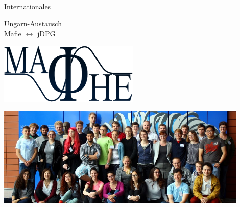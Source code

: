 \documentclass[
]{beamer}
\begin{document}
\begin{frame}{Internationales}
  \begin{minipage}{0.38\textwidth}
    \begin{center}
      Ungarn-Austausch \\ Mafie $\leftrightarrow$ jDPG
    \end{center}
    \begin{flushleft}
      \includegraphics[width=0.5\textwidth]{figure/mafihelogo4}
    \end{flushleft}
  \end{minipage}
  \begin{minipage}{0.6\textwidth}
    \begin{flushright}
      \includegraphics[width=0.9\textwidth]{figure/mafie_2017}
    \end{flushright}
  \end{minipage}

\end{frame}
\end{document}
